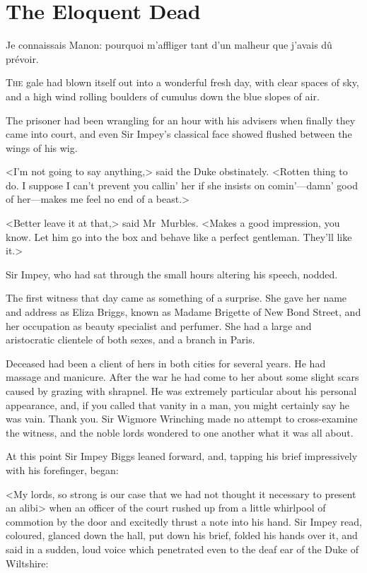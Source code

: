 

\chapter{The Eloquent Dead}

\epigraph{\begin{french}Je connaissais Manon: pourquoi m'affliger tant d'un malheur que j'avais dû prévoir.\end{french}}{}



\lettrine{T}{he} gale had blown itself out into a wonderful fresh day, with clear spaces of sky, and a high wind rolling boulders of cumulus down the blue slopes of air.

\zz
The prisoner had been wrangling for an hour with his advisers when finally they came into court, and even Sir Impey's classical face showed flushed between the wings of his wig.

<I'm not going to say anything,> said the Duke obstinately. <Rotten thing to do. I suppose I can't prevent you callin' her if she insists on comin'—damn' good of her—makes me feel no end of a beast.>

<Better leave it at that,> said Mr~Murbles. <Makes a good impression, you know. Let him go into the box and behave like a perfect gentleman. They'll like it.>

Sir Impey, who had sat through the small hours altering his speech, nodded.

The first witness that day came as something of a surprise. She gave her name and address as Eliza Briggs, known as Madame Brigette of New Bond Street, and her occupation as beauty specialist and perfumer. She had a large and aristocratic clientele of both sexes, and a branch in Paris.

Deceased had been a client of hers in both cities for several years. He had massage and manicure. After the war he had come to her about some slight scars caused by grazing with shrapnel. He was extremely particular about his personal appearance, and, if you called that vanity in a man, you might certainly say he was vain. Thank you. Sir Wigmore Wrinching made no attempt to cross-examine the witness, and the noble lords wondered to one another what it was all about.

At this point Sir Impey Biggs leaned forward, and, tapping his brief impressively with his forefinger, began:

<My lords, so strong is our case that we had not thought it necessary to present an alibi\longdash> when an officer of the court rushed up from a little whirlpool of commotion by the door and excitedly thrust a note into his hand. Sir Impey read, coloured, glanced down the hall, put down
his brief, folded his hands over it, and said in a sudden, loud voice which penetrated even to the deaf ear of the Duke of Wiltshire:

